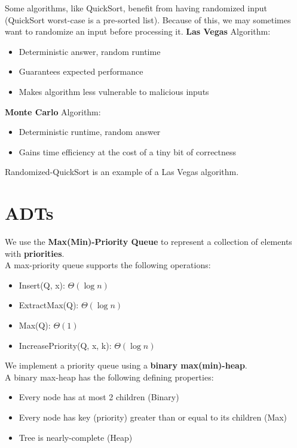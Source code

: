 \documentclass{article}
\begin{document}
\begin{crll}
Some algorithms, like QuickSort, benefit from having randomized input (QuickSort worst-case is a pre-sorted list).
Because of this, we may sometimes want to randomize an input before processing it. \vsp
\textbf{Las Vegas} Algorithm:
\begin{itemize}
    \item Deterministic answer, random runtime
    \item Guarantees expected performance
    \item Makes algorithm less vulnerable to malicious inputs
\end{itemize}
\textbf{Monte Carlo} Algorithm:
\begin{itemize}
    \item Deterministic runtime, random answer
    \item Gains time efficiency at the cost of a tiny bit of correctness
\end{itemize}
Randomized-QuickSort is an example of a Las Vegas algorithm.
\end{crll}

\section{ADTs}

\begin{defn}
We use the \textbf{Max(Min)-Priority Queue} to represent a collection of elements with \textbf{priorities}. \\
A max-priority queue supports the following operations:
\begin{itemize}
    \item Insert(Q, x): $ \Theta(\log n) $
    \item ExtractMax(Q): $ \Theta(\log n) $
    \item Max(Q): $ \Theta(1) $
    \item IncreasePriority(Q, x, k): $ \Theta(\log n) $
\end{itemize}

We implement a priority queue using a \textbf{binary max(min)-heap}. \\
A binary max-heap has the following defining properties:
\begin{itemize}
    \item Every node has at most 2 children (Binary)
    \item Every node has key (priority) greater than or equal to its children (Max)
    \item Tree is nearly-complete (Heap)
\end{itemize}
\end{defn}
\end{document}
